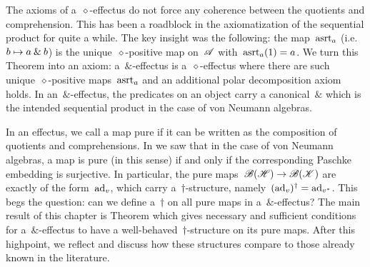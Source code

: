 \documentclass[b]{subfiles}
\begin{document}
\begin{parsec}
\begin{point}%
The axioms of a~$\diamond$-effectus do not force
    any coherence between the quotients and comprehension.
This has been a roadblock in the axiomatization
    of the sequential product for quite a while.
The key insight was the following:
    the map~$\mathrm{asrt}_a$ (i.e.~$b\mapsto a \mathbin{\&} b$)
    is the unique~$\diamond$-positive map on~$\mathscr{A}$
    with~$\mathrm{asrt}_a(1) = a$.
We turn this Theorem into an axiom:
    a~$\&$-effectus is
    a~$\diamond$-effectus
    where there are such unique~$\diamond$-positive maps~$\mathrm{asrt}_a$
    and an additional polar decomposition axiom holds.
In an~$\&$-effectus, the predicates on an object carry a canonical~$\&$
    which is the intended sequential product in
    the case of von Neumann algebras.
\end{point}
\begin{point}%
In an effectus, we call a map pure if it can be written
    as the composition of quotients and comprehensions.
In \TODO{} we saw that in the case of von Neumann algebras,
    a map is pure (in this sense) if and only if the corresponding Paschke
    embedding is surjective.
In particular, the pure maps~$\mathscr{B}(\mathscr{H}) \to \mathscr{B}(\mathscr{K})$
    are exactly of the form~$\mathrm{ad}_v$,
    which carry a~$\dagger$-structure,
    namely~$(\mathrm{ad}_v)^\dagger = \mathrm{ad}_{v^*}$.
This begs the question: can we define a~$\dagger$ on all pure maps
    in a~$\&$-effectus?
The main result of this chapter
    is Theorem 
    which gives  necessary and sufficient conditions
    for a~$\&$-effectus
    to have a well-behaved~$\dagger$-structure on its pure maps.
After this highpoint, we reflect and discuss how these
    structures compare to those already known in the literature.
\end{point}
\end{parsec}
\end{document}
